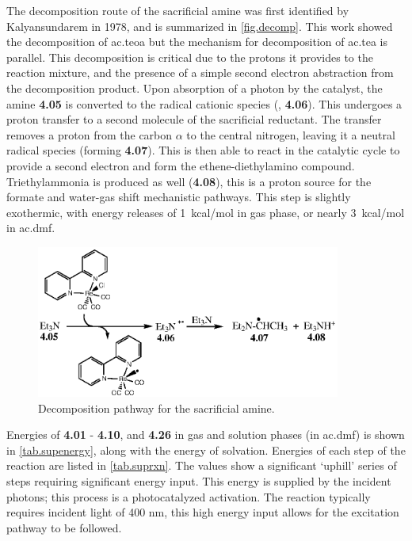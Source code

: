 The decomposition route of the sacrificial amine was first identified by Kalyansundarem in 1978\autocite{kalyanasundaram1978}, and is summarized in \autoref{fig.decomp}. This work showed the decomposition of \gls{ac.teoa} but the mechanism for decomposition of \gls{ac.tea} is parallel. This decomposition is critical due to the protons it provides to the reaction mixture, and the presence of a simple second electron abstraction from the decomposition product. Upon absorption of a photon by the catalyst, the amine \textbf{4.05} is converted to the radical cationic species (, \textbf{4.06}). This undergoes a proton transfer to a second molecule of the sacrificial reductant. The transfer removes a proton from the carbon $\alpha$ to the central nitrogen, leaving it a neutral radical species (forming \textbf{4.07}). This is then able to react in the catalytic cycle to provide a second electron and form the ethene-diethylamino compound. Triethylammonia is produced as well (\textbf{4.08}), this is a proton source for the formate and water-gas shift mechanistic pathways. This step is slightly exothermic, with energy releases of 1~kcal/mol in gas phase, or nearly 3~kcal/mol in \gls{ac.dmf}.

\begin{figure}[!htb]
 \begin{center}
  \includegraphics[clip=true, width=100mm, keepaspectratio]{images/reddecomp.eps}
 \end{center}
\caption{Decomposition pathway for the sacrificial amine.}
\label{fig.decomp}
\end{figure} 

Energies of \textbf{4.01} - \textbf{4.10}, and \textbf{4.26} in gas and solution phases (in \gls{ac.dmf}) is shown in \autoref{tab.supenergy}, along with the energy of solvation. Energies of each step of the reaction are listed in \autoref{tab.suprxn}. The values show a significant `uphill' series of steps requiring significant energy input. This energy is supplied by the incident photons; this process is a photocatalyzed activation. The reaction typically requires incident light of 400 nm\autocite{hawecker1983}, this high energy input allows for the excitation pathway to be followed.

